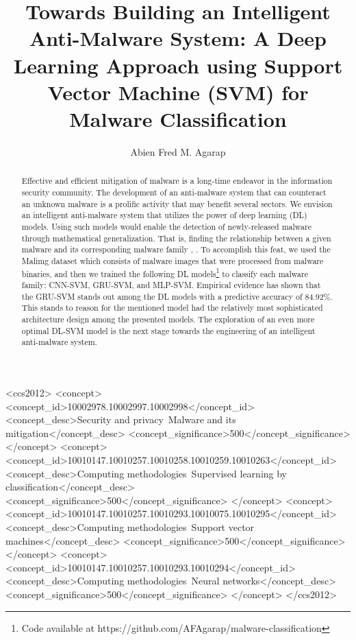\documentclass[sigconf]{acmart}
\begin{document}
\title{Towards Building an Intelligent Anti-Malware System: A Deep Learning Approach using Support Vector Machine (SVM) for Malware Classification}

\author{Abien Fred M. Agarap}

\begin{abstract}
Effective and efficient mitigation of malware is a long-time endeavor in the information security community. The development of an anti-malware system that can counteract an unknown malware is a prolific activity that may benefit several sectors. We envision an intelligent anti-malware system that utilizes the power of deep learning (DL) models. Using such models would enable the detection of newly-released malware through mathematical generalization. That is, finding the relationship between a given malware  and its corresponding malware family , . To accomplish this feat, we used the Malimg dataset\cite{nataraj2011malware} which consists of malware images that were processed from malware binaries, and then we trained the following DL models\footnote{Code available at https://github.com/AFAgarap/malware-classification} to classify each malware family: CNN-SVM\cite{tang2013deep}, GRU-SVM\cite{agarap2017neural}, and MLP-SVM. Empirical evidence has shown that the GRU-SVM stands out among the DL models with a predictive accuracy of 84.92\%. This stands to reason for the mentioned model had the relatively most sophisticated architecture design among the presented models. The exploration of an even more optimal DL-SVM model is the next stage towards the engineering of an intelligent anti-malware system.
\end{abstract}

 \begin{CCSXML}
<ccs2012>
<concept>
<concept_id>10002978.10002997.10002998</concept_id>
<concept_desc>Security and privacy~Malware and its mitigation</concept_desc>
<concept_significance>500</concept_significance>
</concept>
<concept>
<concept_id>10010147.10010257.10010258.10010259.10010263</concept_id>
<concept_desc>Computing methodologies~Supervised learning by classification</concept_desc>
<concept_significance>500</concept_significance>
</concept>
<concept>
<concept_id>10010147.10010257.10010293.10010075.10010295</concept_id>
<concept_desc>Computing methodologies~Support vector machines</concept_desc>
<concept_significance>500</concept_significance>
</concept>
<concept>
<concept_id>10010147.10010257.10010293.10010294</concept_id>
<concept_desc>Computing methodologies~Neural networks</concept_desc>
<concept_significance>500</concept_significance>
</concept>
</ccs2012>
\end{CCSXML}
\end{document}
